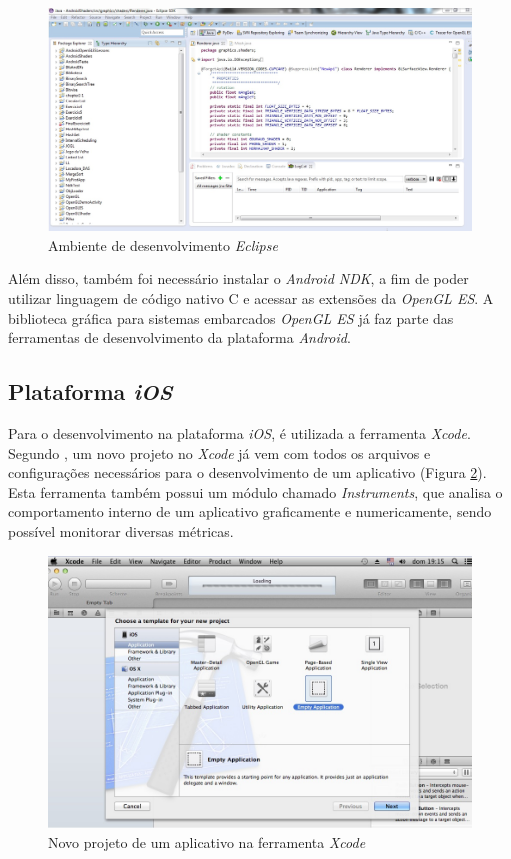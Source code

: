 	\begin{figure}[ht]
	\centering
		\includegraphics[keepaspectratio=true,scale=0.35]{figuras/eclipse.jpg}
	\caption{Ambiente de desenvolvimento \textit{Eclipse}}
	\label{eclipse}
	\end{figure}

	Além disso, também foi necessário instalar o \textit{Android NDK}, a fim de poder utilizar linguagem de código nativo C e acessar as extensões da \textit{OpenGL ES}. A biblioteca gráfica para sistemas embarcados \textit{OpenGL ES} já faz parte das ferramentas de desenvolvimento da plataforma \textit{Android}. 

\subsection{Plataforma \textit{iOS}}

	Para o desenvolvimento na plataforma \textit{iOS}, é utilizada a ferramenta \textit{Xcode}. Segundo \cite{neub2013}, um novo projeto no \textit{Xcode} já vem com todos os arquivos e configurações necessários para o desenvolvimento de um aplicativo (Figura \ref{xcode}).  Esta ferramenta também possui um módulo chamado \textit{Instruments}, que analisa o comportamento interno de um aplicativo graficamente e numericamente, sendo possível monitorar diversas métricas.  

	\begin{figure}[ht]
	\centering
		\includegraphics[keepaspectratio=true,scale=0.5]{figuras/xcode.jpg}
	\caption{Novo projeto de um aplicativo na ferramenta \textit{Xcode}}
	\label{xcode}
	\end{figure}

